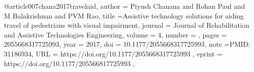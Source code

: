 @article{007chana2017travelaid,
author = {Piyush Chanana and Rohan Paul and M Balakrishnan and PVM Rao},
title ={Assistive technology solutions for aiding travel of pedestrians with visual impairment},
journal = {Journal of Rehabilitation and Assistive Technologies Engineering},
volume = {4},
number = {},
pages = {2055668317725993},
year = {2017},
doi = {10.1177/2055668317725993},
note ={PMID: 31186934},
URL = { https://doi.org/10.1177/2055668317725993 },
eprint = { https://doi.org/10.1177/205566817725993 },
}
